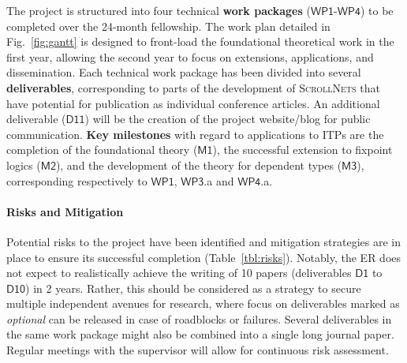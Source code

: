 \documentclass[11pt]{msca-pf}
\newcommand{\proj}{\small\textsc{ScrollNets}}
\newcommand{\WP}[1]{$\mathsf{WP#1}$}
\newcommand{\MI}[1]{$\mathsf{M#1}$}
\newcommand{\DE}[1]{$\mathsf{D#1}$}
\begin{document}
The project is structured into four technical \textbf{work packages} (\WP{1}-\WP{4}) to be completed
over the 24-month fellowship. The work plan detailed in Fig.~\ref{fig:gantt} is designed to
front-load the foundational theoretical work in the first year, allowing the second year to focus on
extensions, applications, and dissemination. Each technical work package has been divided into
several \textbf{deliverables}, corresponding to parts of the development of {\proj} that have
potential for publication as individual conference articles. An additional deliverable (\DE{11})
will be the creation of the project website/blog for public communication. \textbf{Key milestones}
with regard to applications to ITPs are the completion of the foundational theory (\MI{1}), the
successful extension to fixpoint logics (\MI{2}), and the development of the theory for dependent
types (\MI{3}), corresponding respectively to \WP{1}, \WP{3}.a and \WP{4}.a.

\paragraph{Risks and Mitigation}
Potential risks to the project have been identified and mitigation strategies are in place to ensure
its successful completion (Table~\ref{tbl:risks}). Notably, the ER does not expect to realistically
achieve the writing of 10 papers (deliverables \DE{1} to \DE{10}) in 2 years. Rather, this should be
considered as a strategy to secure multiple independent avenues for research, where focus on
deliverables marked as \emph{optional} can be released in case of roadblocks or failures. Several
deliverables in the same work package might also be combined into a single long journal paper.
Regular meetings with the supervisor will allow for continuous risk assessment.
\end{document}
